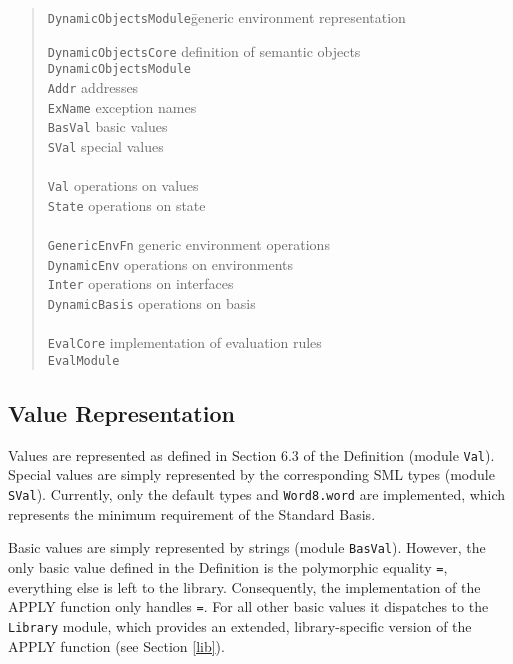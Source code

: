 \documentclass[twoside,titlepage]{article}
\begin{document}
\begin{quote}
\begin{tabbing}
{\tt DynamicObjectsModule}\qquad\= generic environment representation
\kill

{\tt DynamicObjectsCore} \> definition of semantic objects \\
{\tt DynamicObjectsModule} \> \\

{\tt Addr}		\> addresses \\
{\tt ExName}		\> exception names \\
{\tt BasVal}		\> basic values \\
{\tt SVal}		\> special values \\
\\
{\tt Val}		\> operations on values \\
{\tt State}		\> operations on state \\
\\
{\tt GenericEnvFn}	\> generic environment operations \\
{\tt DynamicEnv}	\> operations on environments \\
{\tt Inter}		\> operations on interfaces \\
{\tt DynamicBasis}	\> operations on basis \\
\\
{\tt EvalCore}		\> implementation of evaluation rules \\
{\tt EvalModule}	\> \\
\end{tabbing}
\end{quote}


\subsection{Value Representation}
\label{values}

Values are represented as defined in Section 6.3 of the Definition (module {\tt Val}). Special values are simply represented by the corresponding SML types (module {\tt SVal}). Currently, only the default types and {\tt Word8.word} are implemented, which represents the minimum requirement of the Standard Basis.

Basic values are simply represented by strings (module {\tt BasVal}). However, the only basic value defined in the Definition is the polymorphic equality {\tt =}, everything else is left to the library. Consequently, the implementation of the APPLY function only handles {\tt =}. For all other basic values it dispatches to the {\tt Library} module, which provides an extended, library-specific version of the APPLY function (see Section \ref{lib}).
\end{document}
